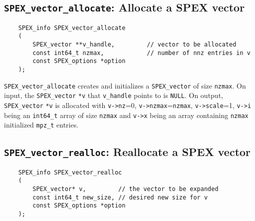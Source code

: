 \documentclass[12pt]{report}
\theoremstyle{definition}
\begin{document}
\subsection{\texttt{SPEX\_vector\_allocate}: Allocate a SPEX vector} \label{ss:spex_vector_allocate}

\begin{mdframed}[userdefinedwidth=6in]
{\footnotesize
\begin{verbatim}
    SPEX_info SPEX_vector_allocate
    (
        SPEX_vector **v_handle,         // vector to be allocated
        const int64_t nzmax,            // number of nnz entries in v
        const SPEX_options *option
    ); 
\end{verbatim}
} \end{mdframed}

\verb|SPEX_vector_allocate| creates and initializes a \verb|SPEX_vector| of size \verb|nzmax|. On input, the \verb|SPEX_vector| \verb|*v| that  \verb|v_handle| points to is \verb|NULL|. On output, \verb|SPEX_vector| \verb|*v| is allocated with \verb|v->nz|=0, \verb|v->nzmax|=\verb|nzmax|, \verb|v->scale|=1, \verb|v->i| being an \verb|int64_t| array of size \verb|nzmax| and \verb|v->x| being an array containing \verb|nzmax| initialized \verb|mpz_t| entries.

\subsection{\texttt{SPEX\_vector\_realloc}: Reallocate a SPEX vector} \label{ss:spex_vector_realloc}


\begin{mdframed}[userdefinedwidth=6in]
{\footnotesize
\begin{verbatim}
    SPEX_info SPEX_vector_realloc
    (
        SPEX_vector* v,         // the vector to be expanded
        const int64_t new_size, // desired new size for v
        const SPEX_options *option
    ); 
\end{verbatim}
} \end{mdframed}
\end{document}
